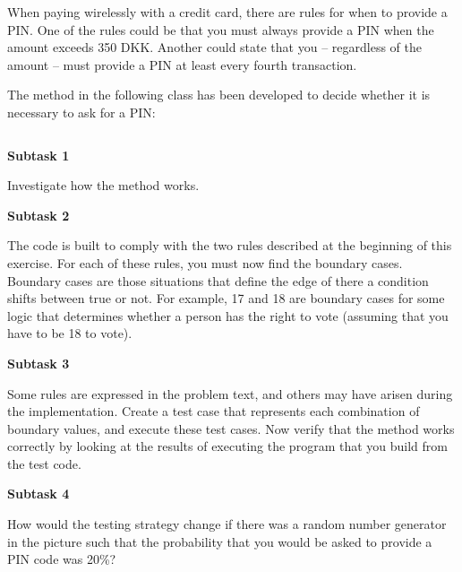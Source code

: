 When paying wirelessly with a credit card, there are rules for when to provide a PIN. One of the rules could be that you must always provide a PIN when the amount exceeds 350 DKK. Another could state that you -- regardless of the amount -- must provide a PIN at least every fourth transaction.

The method  in the following class has been developed to decide whether it is necessary to ask for a PIN:

\inputminted{csharp}{\context/question/Pin.cs}

\textbf{Subtask 1}

Investigate how the method  works.

\textbf{Subtask 2}

The code is built to comply with the two rules described at the beginning of this exercise. For each of these rules, you must now find the boundary cases. Boundary cases are those situations that define the edge of there a condition shifts between true or not. For example, 17 and 18 are boundary cases for some logic that determines whether a person has the right to vote (assuming that you have to be 18 to vote).

\textbf{Subtask 3}

Some rules are expressed in the problem text, and others may have arisen during the implementation. Create a test case that represents each combination of boundary values, and execute these test cases. Now verify that the method  works correctly by looking at the results of executing the program that you build from the test code.

\textbf{Subtask 4}

How would the testing strategy change if there was a random number generator in the picture such that the probability that you would be asked to provide a PIN code was 20\%?
